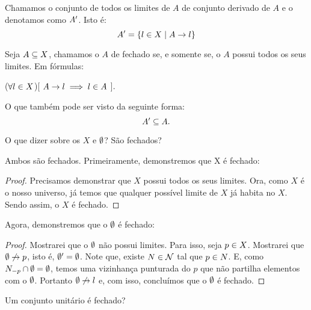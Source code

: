 \begin{definition}
	\label{def:derivado}
	Chamamos o conjunto de todos os limites de $A$ de conjunto derivado de $A$ e o denotamos como $A^{\prime}$. Isto é:
	\[
		A^{\prime} = \left\{ l \in X \mid A \rightarrow l\right\}
	\]
\end{definition}

\begin{definition}[Fechado]
	\label{def:fechado}
	Seja $A \subseteq X$, chamamos o $A$ de fechado se, e somente se, o $A$ possui todos os seus limites. Em fórmulas:
	\begin{center}
		($\forall l \in X$)[ $A \rightarrow l \implies l \in A$ ].
	\end{center}
	O que também pode ser visto da seguinte forma:
	\[
		A^{\prime} \subseteq A.
	\]
\end{definition}

\begin{question}
	\label{universo-fechado}
	\label{vazio-fechado}
	O que dizer sobre os $X$ e $\emptyset$? São fechados?
\end{question}

\begin{answer}
	Ambos são fechados. Primeiramente, demonstremos que X é fechado:
	\begin{proof}
		Precisamos demonstrar que $X$ possui todos os seus limites. Ora, como $X$ é o nosso universo, já temos que qualquer possível limite de $X$ já habita no $X$. Sendo assim, o $X$ é fechado.
	\end{proof}
	Agora, demonstremos que o $\emptyset$ é fechado:
	\begin{proof}
		Mostrarei que o $\emptyset$ não possui limites. Para isso, seja $p \in X$. Mostrarei que $\emptyset \not\rightarrow p$, isto é, $\emptyset^{\prime} = \emptyset$. Note que, existe $N \in \mathcal{N}$ tal que $p \in N$. E, como $N_{-p} \cap \emptyset = \emptyset$, temos uma vizinhança punturada do $p$ que não partilha  elementos com o $\emptyset$. Portanto $\emptyset \not\rightarrow l$ e, com isso, concluímos que o $\emptyset$ é fechado.
	\end{proof}
\end{answer}

\begin{question}
	Um conjunto unitário é fechado?
\end{question}

